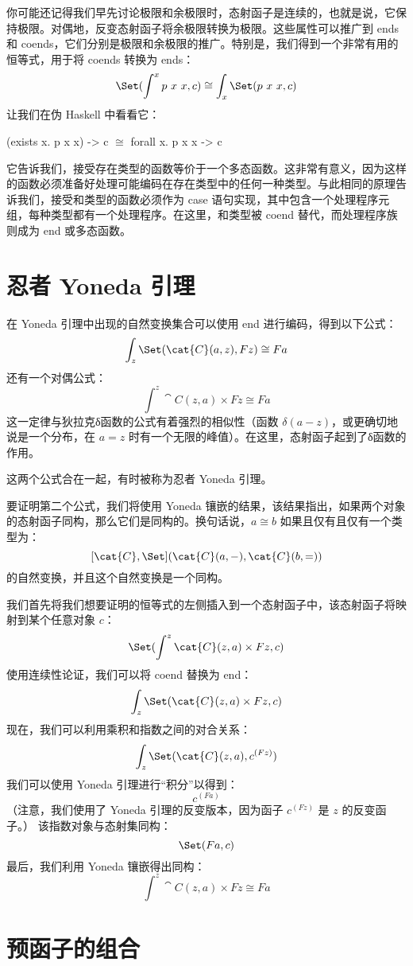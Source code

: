 你可能还记得我们早先讨论极限和余极限时，态射函子是连续的，也就是说，它保持极限。对偶地，反变态射函子将余极限转换为极限。这些属性可以推广到 ends 和 coends，它们分别是极限和余极限的推广。特别是，我们得到一个非常有用的恒等式，用于将 coends 转换为 ends：
\[\Set(\int^x p\ x\ x, c) \cong \int_x \Set(p\ x\ x, c)\]
让我们在伪 Haskell 中看看它：

\begin{snipv}
(exists x. p x x) -> c \ensuremath{\cong} forall x. p x x -> c
\end{snipv}
它告诉我们，接受存在类型的函数等价于一个多态函数。这非常有意义，因为这样的函数必须准备好处理可能编码在存在类型中的任何一种类型。与此相同的原理告诉我们，接受和类型的函数必须作为 case 语句实现，其中包含一个处理程序元组，每种类型都有一个处理程序。在这里，和类型被 coend 替代，而处理程序族则成为 end 或多态函数。

\section{忍者 Yoneda 引理}

在 Yoneda 引理中出现的自然变换集合可以使用 end 进行编码，得到以下公式：
\[\int_z \Set(\cat{C}(a, z), F z) \cong F a\]
还有一个对偶公式：
\[\int^z \cat{C}(z, a)\times{}F z \cong F a\]
这一定律与狄拉克δ函数的公式有着强烈的相似性（函数 $\delta(a - z)$，或更确切地说是一个分布，在 $a = z$ 时有一个无限的峰值）。在这里，态射函子起到了δ函数的作用。

这两个公式合在一起，有时被称为忍者 Yoneda 引理。

要证明第二个公式，我们将使用 Yoneda 镶嵌的结果，该结果指出，如果两个对象的态射函子同构，那么它们是同构的。换句话说，$a \cong b$ 如果且仅有且仅有一个类型为：
\[[\cat{C}, \Set](\cat{C}(a, -), \cat{C}(b, =))\]
的自然变换，并且这个自然变换是一个同构。

我们首先将我们想要证明的恒等式的左侧插入到一个态射函子中，该态射函子将映射到某个任意对象 $c$：
\[\Set(\int^z \cat{C}(z, a)\times{}F z, c)\]
使用连续性论证，我们可以将 coend 替换为 end：
\[\int_z \Set(\cat{C}(z, a)\times{}F z, c)\]
现在，我们可以利用乘积和指数之间的对合关系：
\[\int_z \Set(\cat{C}(z, a), c^{(F z)})\]
我们可以使用 Yoneda 引理进行“积分”以得到：
\[c^{(F a)}\]
（注意，我们使用了 Yoneda 引理的反变版本，因为函子 $c^{(F z)}$ 是 $z$ 的反变函子。）
该指数对象与态射集同构：
\[\Set(F a, c)\]
最后，我们利用 Yoneda 镶嵌得出同构：
\[\int^z \cat{C}(z, a)\times{}F z \cong F a\]

\section{预函子的组合}

